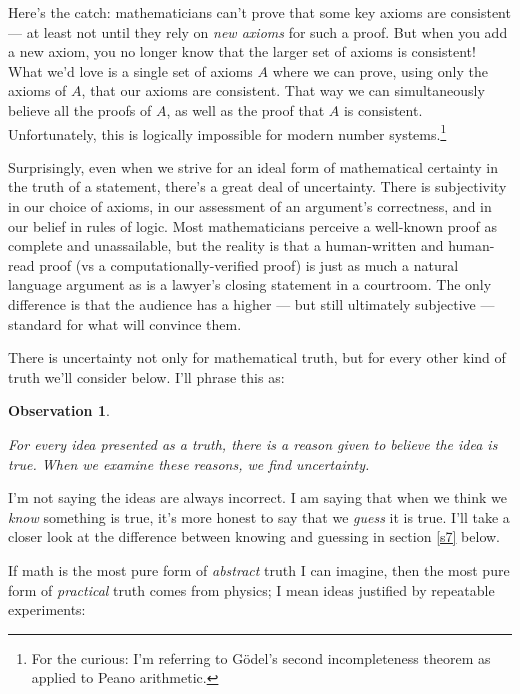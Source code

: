 \documentclass[11pt, oneside]{article}
\newtheorem{obs}{Observation}
\begin{document}
\begin{itemize}
        Here's the catch: mathematicians can't prove that some key axioms are
        consistent --- at least not until they rely on {\em new axioms} for such
        a proof. But when you add a new axiom, you no longer know that the
        larger set of axioms is consistent! What we'd love is a single set of
        axioms $A$ where we can prove, using only the axioms of $A$, that our
        axioms are consistent. That way we can simultaneously believe all the
        proofs of $A$, as
        well as the proof that $A$ is consistent. Unfortunately, this is
        logically impossible for modern number
        systems.\footnote{For
        the curious: I'm referring to G\"odel's second
        incompleteness theorem as applied to Peano arithmetic.}
\end{itemize}

Surprisingly,
even when we strive for an ideal form of
mathematical certainty in the truth of a statement, there's a great deal of
uncertainty.
There is subjectivity in our choice of axioms,
in our assessment of an argument's correctness,
and
in our belief in rules of logic.
Most mathematicians perceive a well-known proof as complete and unassailable,
but the reality is that a human-written and human-read proof (vs
a computationally-verified proof) is just as much a natural language argument as
is a lawyer's closing statement in a courtroom.
The only difference is that the audience has a higher --- but still ultimately
subjective --- standard for what will convince them.

There is uncertainty not only for mathematical truth, but for
every other kind of truth we'll consider below.
I'll phrase this as:

\newcommand{\obsone}{
    For every idea presented as a truth, there is a reason
    given to believe the idea is true.
    When we examine these reasons, we find uncertainty.
}
\begin{obs}\label{o1}
    \obsone
\end{obs}

I'm not saying the ideas are always incorrect. I am saying that when we think we
{\em know} something is true, it's more honest to say that we {\em guess} it is
true. I'll take a closer look at
the difference between knowing and guessing in section \ref{s7} below.

If math is the most pure form of {\em abstract} truth I can imagine, then the
most pure form of {\em practical} truth comes from physics; I mean ideas
justified by repeatable experiments:
\end{document}
